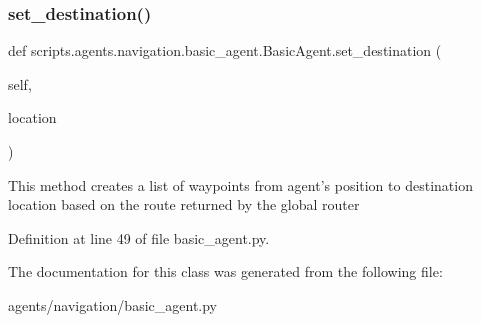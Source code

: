\subsubsection{\texorpdfstring{set\+\_\+destination()}{set\_destination()}}
{\footnotesize\ttfamily def scripts.\+agents.\+navigation.\+basic\+\_\+agent.\+Basic\+Agent.\+set\+\_\+destination (\begin{DoxyParamCaption}\item[{}]{self,  }\item[{}]{location }\end{DoxyParamCaption})}

\begin{DoxyVerb}This method creates a list of waypoints from agent's position to destination location
based on the route returned by the global router
\end{DoxyVerb}
 

Definition at line 49 of file basic\+\_\+agent.\+py.



The documentation for this class was generated from the following file\+:\begin{DoxyCompactItemize}
\item 
agents/navigation/basic\+\_\+agent.\+py\end{DoxyCompactItemize}
